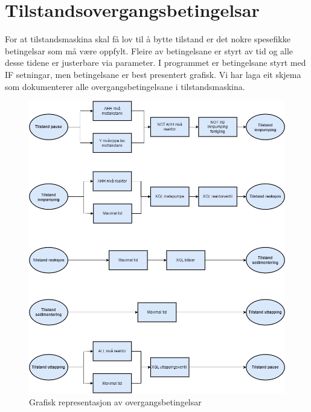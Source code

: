 \section{Tilstandsovergangsbetingelsar}
\thispagestyle{fancy}

For at tilstandsmaskina skal få lov til å bytte tilstand er det nokre spesefikke betingelsar som må være oppfylt.
Fleire av betingelsane er styrt av tid og alle desse tidene er justerbare via parameter. \newline
I programmet er betingelsane styrt med IF setningar, men betingelsane er best presentert grafisk.
Vi har laga eit skjema som dokumenterer alle overgangsbetingelsane i tilstandsmaskina. \newline \newline

\begin{figure}[htbp]
    \centering
    \includegraphics[scale=0.5]{Figurar/Tilstandsovergang.drawio.png}
    \caption{Grafisk representasjon av overgangsbetingelsar}\label{fig:Tilstandsovergangsbetingelsar}
\end{figure}

\newpage